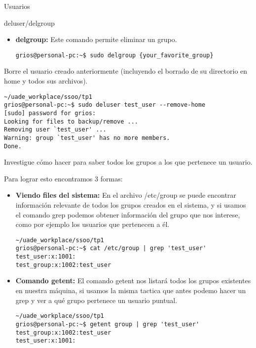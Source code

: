 \begin{section}{Usuarios}
\begin{subsection}{deluser/delgroup}
\begin{itemize}
\item \textbf{delgroup:}
Este comando permite eliminar un grupo.
\begin{lstlisting}[style=Ubuntu]
grios@personal-pc:~$ sudo delgroup {your_favorite_group} 
\end{lstlisting}
\end{itemize}

\begin{quoting}
Borre el usuario creado anteriormente (incluyendo el borrado de su directorio en home y todos sus
archivos).
\end{quoting}

\begin{lstlisting}[style=Ubuntu]
~/uade_workplace/ssoo/tp1
grios@personal-pc:~$ sudo deluser test_user --remove-home  
[sudo] password for grios: 
Looking for files to backup/remove ...
Removing user `test_user' ...
Warning: group `test_user' has no more members.
Done.

\end{lstlisting}


\begin{quoting}
Investigue cómo hacer para saber todos los grupos a los que pertenece un usuario.
\end{quoting}

Para lograr esto encontramos 3 formas:

\begin{itemize}

\item \textbf{Viendo files del sistema:}
En el archivo /etc/group se puede encontrar información relevante de todos los grupos creados en el sistema, y si usamos el comando grep podemos obtener información del grupo que nos interese, como por ejemplo los usuarios que pertenecen a él.

\begin{lstlisting}[style=Ubuntu]
~/uade_workplace/ssoo/tp1
grios@personal-pc:~$ cat /etc/group | grep 'test_user'
test_user:x:1001:
test_group:x:1002:test_user
\end{lstlisting}

\item \textbf{Comando getent:}
El comando getent nos listará todos los grupos existentes en nuestra máquina, si usamos la misma tactica que antes podemo hacer un grep y ver a qué grupo pertenece un usuario puntual.

\begin{lstlisting}[style=Ubuntu]
~/uade_workplace/ssoo/tp1
grios@personal-pc:~$ getent group | grep 'test_user'
test_group:x:1002:test_user
test_user:x:1001:
\end{lstlisting}


\end{itemize}
\end{subsection}
\end{section}
